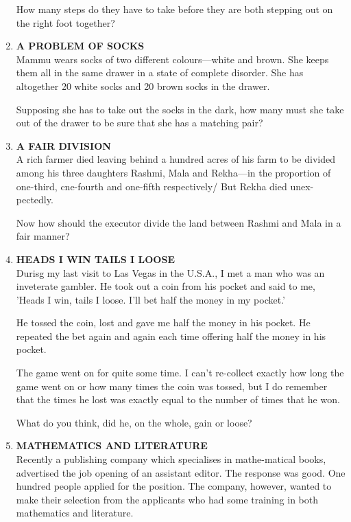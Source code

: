 \documentclass[12pt]{article}
\begin{document}
\begin{enumerate}
How  many  steps  do they have  to take  before  they  are both  stepping  out on the right  foot  together? 
%
\item \textbf{A  PROBLEM  OF SOCKS} \\ 
Mammu  wears  socks  of two  different  colours—white and brown.  She  keeps  them  all in the same  drawer  in a state of complete  disorder. She has altogether  20 white  socks  and 20 brown  socks in the drawer.  

Supposing  she has to take  out the socks  in the dark,  how  many  must  she take  out of the drawer  to be sure  that she has a matching  pair? 
%
\item \textbf{A  FAIR  DIVISION}\\ 
A rich farmer  died  leaving  behind  a hundred  acres  of his farm  to be divided  among  his three  daughters  Rashmi, Mala  and  Rekha—in  the  proportion  of one-third,  cne-fourth  and one-fifth  respectively/  But  Rekha  died  unex-pectedly. 

Now  how  should  the executor  divide  the land  between Rashmi  and Mala  in a fair  manner? 
%
\item \textbf{HEADS  I WIN  TAILS  I LOOSE} \\
Durisg  my last visit  to Las Vegas  in the U.S.A.,  I met  a man who  was an inveterate  gambler.  He  took  out  a coin from  his pocket  and said  to me, 'Heads  I win,  tails  I loose. I'll bet half  the money  in my pocket.' 

He tossed  the coin,  lost and gave  me half the money  in his pocket.  He  repeated  the bet again  and again  each  time offering  half  the money  in his pocket. 

The game  went  on for  quite  some  time.  I can't  re-collect  exactly  how  long  the game  went  on or how  many times  the coin  was  tossed,  but  I do remember  that  the times  he lost was exactly  equal  to the  number  of times that he won. 

What  do you  think,  did  he, on the  whole,  gain  or loose? 
%
\item \textbf{MATHEMATICS  AND  LITERATURE} \\
Recently  a publishing  company  which  specialises  in mathe-matical  books,  advertised  the job opening  of an assistant editor.  The  response  was  good.  One  hundred  people applied  for the position.  The  company,  however,  wanted to make  their  selection  from  the applicants  who  had  some training  in both  mathematics  and literature. 


\end{enumerate}
\end{document}
